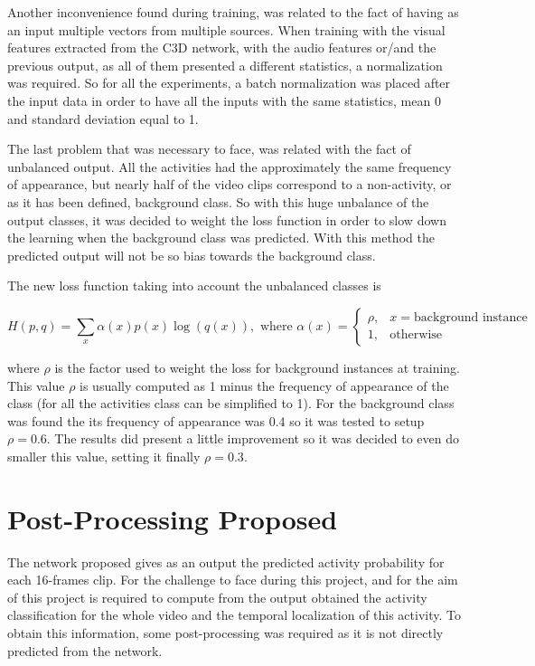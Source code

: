 Another inconvenience found during training, was related to the fact of having as an input multiple vectors from multiple sources. When training with the visual features extracted from the C3D network, with the audio features or/and the previous output, as all of them presented a different statistics, a normalization was required. So for all the experiments, a batch normalization\cite{ioffe2015batch} was placed after the input data in order to have all the inputs with the same statistics, mean 0 and standard deviation equal to 1. 

The last problem that was necessary to face, was related with the fact of unbalanced output. All the activities had the approximately the same frequency of appearance, but nearly half of the video clips correspond to a non-activity, or as it has been defined, background class. So with this huge unbalance of the output classes, it was decided to weight the loss function in order to slow down the learning when the background class was predicted. With this method the predicted output will not be so bias towards the background class.

The new loss function taking into account the unbalanced classes is

\begin{equation}
	H(p,q) = \sum_x \alpha(x) p(x) \log (q(x)), \text{ where } \alpha(x) = 
    \begin{cases}
        \rho, & x = \text{background instance}\\
        1,    & \text{otherwise}
    \end{cases}
\end{equation}

where $\rho$ is the factor used to weight the loss for background instances at training. This value $\rho$ is usually computed as 1 minus the frequency of appearance of the class (for all the activities class can be simplified to 1). For the background class was found the its frequency of appearance was 0.4 so it was tested to setup $\rho = 0.6$. The results did present a little improvement so it was decided to even do smaller this value, setting it finally $\rho = 0.3$.

\section{Post-Processing Proposed}

The network proposed gives as an output the predicted activity probability for each 16-frames clip. For the challenge to face during this project, and for the aim of this project is required to compute from the output obtained the activity classification for the whole video and the temporal localization of this activity. To obtain this information, some post-processing was required as it is not directly predicted from the network.

